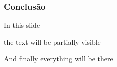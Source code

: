 \begin{frame}
\frametitle{Conclusão}
In this slide \pause

the text will be partially visible \pause

And finally everything will be there
\end{frame}